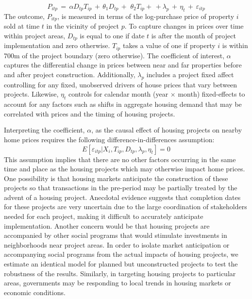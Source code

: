 \documentclass[12pt]{article}
\begin{document}
\begin{equation*}
P_{itp} \, = \, \alpha D_{tp}T_{ip} \, + \,\theta_1 D_{tp} \, + \, \,\theta_2 T_{ip}+ \, +  \lambda_p \,  + \, \eta_{t} \, + \, \varepsilon_{itp}
\end{equation*}
The outcome, $P_{itp}$, is measured in terms of the log-purchase price of property $i$ sold at time $t$ in the vicinity of project $p$.  To capture changes in prices over time within project areas, $D_{tp}$ is equal to one if date $t$ is after the month of project implementation and zero otherwise.  $T_{ip}$ takes a value of one if property $i$ is within 700m of the project boundary (zero otherwise).  The coefficient of interest, $\alpha$ captures the differential change in prices between near and far properties before and after project construction.   Additionally, $\lambda_p$ includes a project fixed affect controlling for any fixed, unobserved drivers of house prices that vary between projects.  Likewise, $\eta_{t}$ controls for calendar month (year$\,\times\,$month) fixed-effects to account for any factors such as shifts in aggregate housing demand that may be correlated with prices and the timing of housing projects.

Interpreting the coefficient, $\alpha$, as the causal effect of housing projects on nearby home prices requires the following difference-in-differences assumption:
\begin{equation*}
E[\varepsilon_{itp}|X_{i},T_{ip},D_{tp},\lambda_p,\eta_{t}]=0
\end{equation*}
This assumption implies that there are no other factors occurring in the same time and place as the housing projects which may otherwise impact home prices.  One possibility is that housing markets anticipate the construction of these projects so that transactions in the pre-period may be partially treated by the advent of a housing project.  Anecdotal evidence suggests that completion dates for these projects are very uncertain due to the large coordination of stakeholders needed for each project, making it difficult to accurately anticipate implementation.  Another concern would be that housing projects are accompanied by other social programs that would stimulate investments in neighborhoods near project areas.  In order to isolate market anticipation or accompanying social programs from the actual impacts of housing projects, we estimate an identical model for planned but unconstructed projects to test the robustness of the results.  Similarly, in targeting housing projects to particular areas, governments may be responding to local trends in housing markets or economic conditions.  
\end{document}
